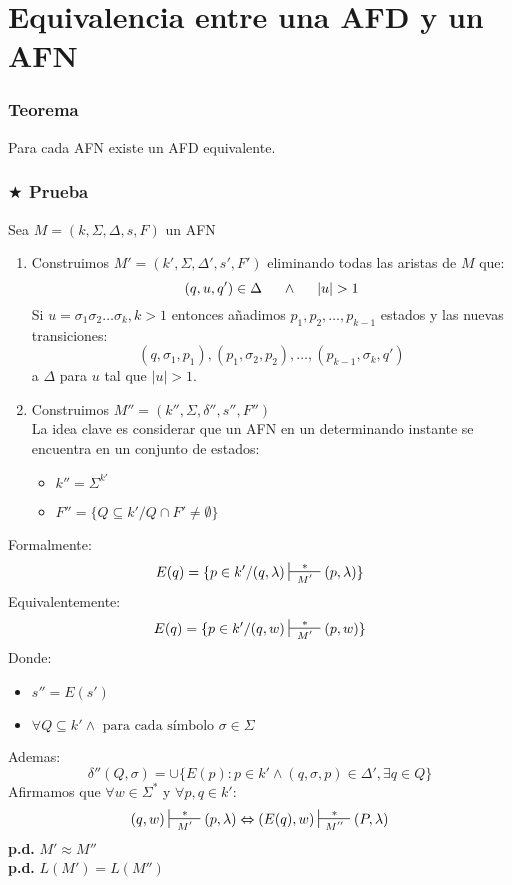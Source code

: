 \section{Equivalencia entre una AFD y un AFN}
\subsubsection{Teorema}
Para cada AFN existe un AFD equivalente.
\subsubsection{$\bigstar$ Prueba}
Sea $M=(k,\Sigma,\Delta,s,F)$ un AFN
\renewcommand{\labelenumi}{\theenumi}
\renewcommand{\theenumi}{\textbf{\roman{enumi}.)}}
\begin{enumerate}
\item Construimos $M' = (k',\Sigma,\Delta',s',F')$ eliminando todas las aristas de $M$ que:
$$
(q,u,q')\in \Delta \hspace{0.5cm}\wedge\hspace{0.5cm} |u|>1
$$
Si $u=\sigma_1\sigma_2\ldots\sigma_k, k>1$ entonces añadimos $p_1,p_2,\ldots,p_{k-1}$ estados y las nuevas transiciones:
$$
(q,\sigma_1,p_1),(p_1,\sigma_2,p_2),\ldots,(p_{k-1},\sigma_k,q')
$$
a $\Delta$ para $u$ tal que $|u|>1$.
\item Construimos $M''=(k'',\Sigma,\delta'',s'',F'')$\\
La idea clave es considerar que un AFN en un determinando instante se encuentra en un conjunto de estados:
\begin{itemize}
\item $k'' = \Sigma^{k'}$
\item $F''=\{ Q \subseteq k' / Q \cap F' \neq \emptyset \}$
\end{itemize}
\end{enumerate}
Formalmente:
$$
E(q)=\{p\in k' / (q,\lambda)\sststile{M'}{\hspace{0.25cm} * \hspace{0.25cm}} (p,\lambda) \}
$$
Equivalentemente:
$$
E(q)=\{p\in k' / (q,w)\sststile{M'}{\hspace{0.25cm} * \hspace{0.25cm}} (p,w) \}
$$
Donde:
\begin{itemize}
\item $s'' = E(s')$
\item $\forall Q\subseteq k' \wedge \text{ para cada símbolo }\sigma \in \Sigma$
\end{itemize}
Ademas:
$$
\delta''(Q,\sigma)=\cup \{ E(p): p\in k' \wedge (q,\sigma,p)\in\Delta', \exists q\in Q \}
$$
Afirmamos que $\forall w\in\Sigma^*$ y $\forall p,q\in k'$:
$$
(q,w)\sststile{M'}{\hspace{0.25cm} * \hspace{0.25cm}}(p,\lambda)\Leftrightarrow (E(q),w) \sststile{M''}{\hspace{0.25cm} * \hspace{0.25cm}} (P,\lambda)
$$
\textbf{p.d.} $M'\approx M''$ \\
\textbf{p.d.} $L(M')=L(M'')$

